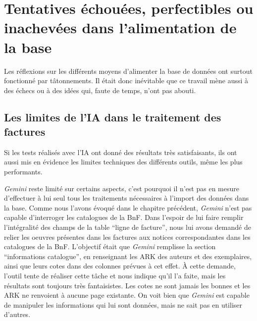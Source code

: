 \chapter{Tentatives échouées, perfectibles ou inachevées dans l'alimentation de la base}

Les réflexions sur les différents moyens d'alimenter la base de données ont surtout fonctionné par tâtonnements. Il était donc inévitable que ce travail mène aussi à des échecs ou à des idées qui, faute de temps, n'ont pas abouti. 

\section{Les limites de l'IA dans le traitement des factures}

Si les tests réalisés avec l'IA ont donné des résultats très satisfaisants, ils ont aussi mis en évidence les limites techniques des différents outils, même les plus performants. 

\vspace{1,5cm}
\emph{Gemini} reste limité sur certains aspects, c'est pourquoi il n'est pas en mesure d'effectuer à lui seul tous les traitements nécessaires à l'import des données dans la base. Comme nous l'avons évoqué dans le chapitre précédent, \emph{Gemini} n'est pas capable d'interroger les catalogues de la BnF. Dans l'espoir de lui faire remplir l'intégralité des champs de la table \enquote{ligne de facture}, nous lui avons demandé de relier les oeuvres présentes dans les factures aux notices correspondantes dans les catalogues de la BnF. L'objectif était que \emph{Gemini} remplisse la section \enquote{informations catalogue}, en renseignant les ARK des auteurs et des exemplaires, ainsi que leurs cotes dans des colonnes prévues à cet effet. À cette demande, l'outil tente de réaliser cette tâche et nous indique qu'il l'a faite, mais les résultats sont toujours très fantaisistes. Les cotes ne sont jamais les bonnes et les ARK ne renvoient à aucune page existante. On voit bien que \emph{Gemini} est capable de manipuler les informations qui lui sont données, mais ne sait pas en utiliser d'autres. 

